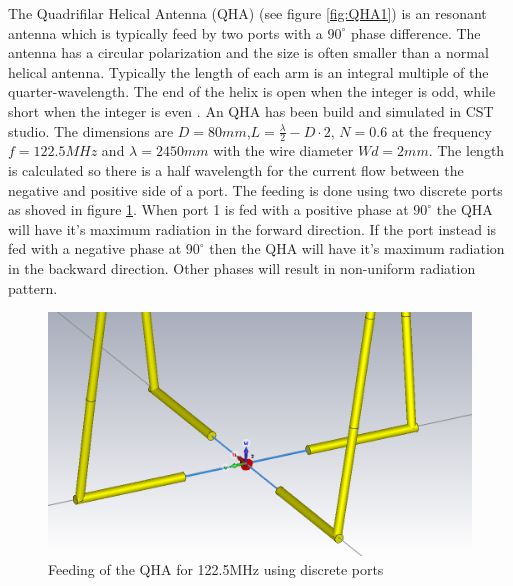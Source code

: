 The Quadrifilar Helical Antenna (QHA) (see figure \ref{fig:QHA1}) is an resonant antenna which is typically feed by two ports with a $90^\circ$ phase difference. The antenna has a circular polarization and the size is often smaller than a normal helical antenna. Typically the length of each arm is an integral multiple of the quarter-wavelength. The end of the helix
is open when the integer is odd, while short when the integer is
even \citep{Bai2014}.
\newline
\newline
An QHA has been build and simulated in CST studio. The dimensions are $D=80mm$,$L=\frac{\lambda}{2}-D\cdot 2$, $N=0.6$ at the frequency $f=122.5MHz$ and $\lambda = 2450mm$ with the wire diameter $Wd = 2mm$. The length is calculated so there is a half wavelength for the current flow between the negative and positive side of a port. The feeding is done using two discrete ports as shoved in figure \ref{fig:QHA2}. When port 1 is fed with a positive phase at $90^\circ$ the QHA will have it's maximum radiation in the forward direction. If the port instead is fed with a negative phase at $90^\circ$ then the QHA will have it's maximum radiation in the backward direction. Other phases will result in non-uniform radiation pattern.  

\begin{figure}[H]
\centering 
\includegraphics[scale = 0.4]{figures/antennas/qha/qha_6_feeding}
\caption{Feeding of the QHA for 122.5MHz using discrete ports}
\label{fig:QHA2}
\end{figure}
 
